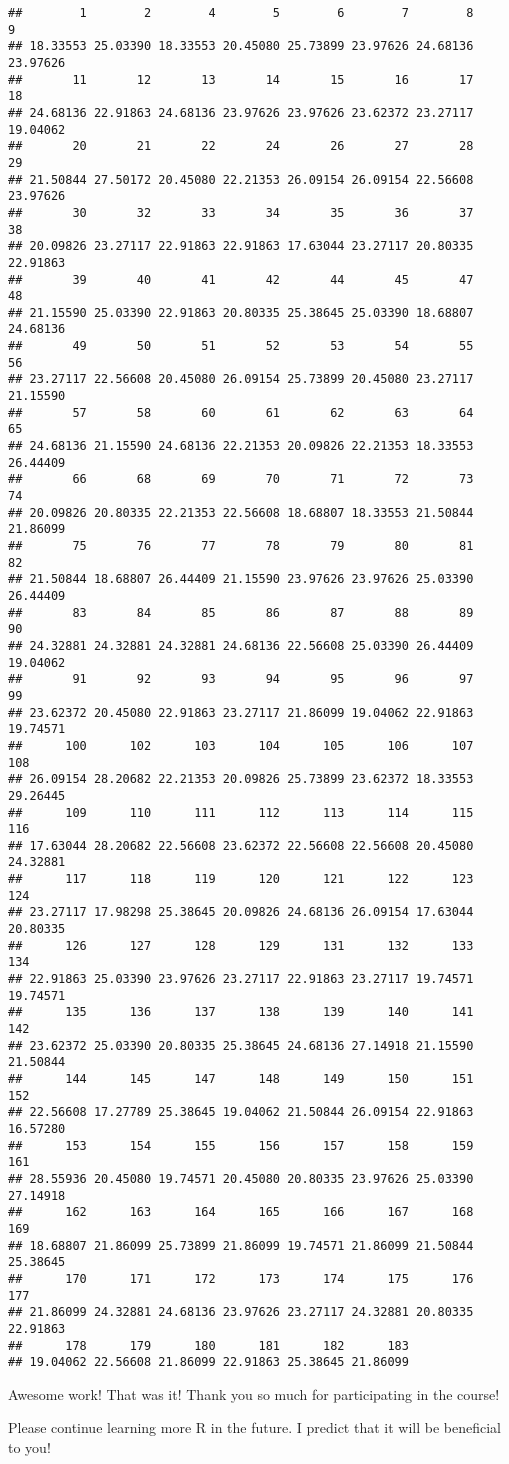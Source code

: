 \documentclass[]{article}
\begin{document}
\begin{verbatim}
##        1        2        4        5        6        7        8        9 
## 18.33553 25.03390 18.33553 20.45080 25.73899 23.97626 24.68136 23.97626 
##       11       12       13       14       15       16       17       18 
## 24.68136 22.91863 24.68136 23.97626 23.97626 23.62372 23.27117 19.04062 
##       20       21       22       24       26       27       28       29 
## 21.50844 27.50172 20.45080 22.21353 26.09154 26.09154 22.56608 23.97626 
##       30       32       33       34       35       36       37       38 
## 20.09826 23.27117 22.91863 22.91863 17.63044 23.27117 20.80335 22.91863 
##       39       40       41       42       44       45       47       48 
## 21.15590 25.03390 22.91863 20.80335 25.38645 25.03390 18.68807 24.68136 
##       49       50       51       52       53       54       55       56 
## 23.27117 22.56608 20.45080 26.09154 25.73899 20.45080 23.27117 21.15590 
##       57       58       60       61       62       63       64       65 
## 24.68136 21.15590 24.68136 22.21353 20.09826 22.21353 18.33553 26.44409 
##       66       68       69       70       71       72       73       74 
## 20.09826 20.80335 22.21353 22.56608 18.68807 18.33553 21.50844 21.86099 
##       75       76       77       78       79       80       81       82 
## 21.50844 18.68807 26.44409 21.15590 23.97626 23.97626 25.03390 26.44409 
##       83       84       85       86       87       88       89       90 
## 24.32881 24.32881 24.32881 24.68136 22.56608 25.03390 26.44409 19.04062 
##       91       92       93       94       95       96       97       99 
## 23.62372 20.45080 22.91863 23.27117 21.86099 19.04062 22.91863 19.74571 
##      100      102      103      104      105      106      107      108 
## 26.09154 28.20682 22.21353 20.09826 25.73899 23.62372 18.33553 29.26445 
##      109      110      111      112      113      114      115      116 
## 17.63044 28.20682 22.56608 23.62372 22.56608 22.56608 20.45080 24.32881 
##      117      118      119      120      121      122      123      124 
## 23.27117 17.98298 25.38645 20.09826 24.68136 26.09154 17.63044 20.80335 
##      126      127      128      129      131      132      133      134 
## 22.91863 25.03390 23.97626 23.27117 22.91863 23.27117 19.74571 19.74571 
##      135      136      137      138      139      140      141      142 
## 23.62372 25.03390 20.80335 25.38645 24.68136 27.14918 21.15590 21.50844 
##      144      145      147      148      149      150      151      152 
## 22.56608 17.27789 25.38645 19.04062 21.50844 26.09154 22.91863 16.57280 
##      153      154      155      156      157      158      159      161 
## 28.55936 20.45080 19.74571 20.45080 20.80335 23.97626 25.03390 27.14918 
##      162      163      164      165      166      167      168      169 
## 18.68807 21.86099 25.73899 21.86099 19.74571 21.86099 21.50844 25.38645 
##      170      171      172      173      174      175      176      177 
## 21.86099 24.32881 24.68136 23.97626 23.27117 24.32881 20.80335 22.91863 
##      178      179      180      181      182      183 
## 19.04062 22.56608 21.86099 22.91863 25.38645 21.86099
\end{verbatim}

Awesome work! That was it! Thank you so much for participating in the
course!

Please continue learning more R in the future. I predict that it will be
beneficial to you!
\end{document}

